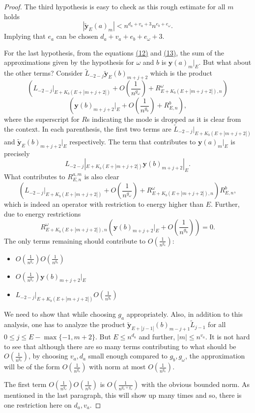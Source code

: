 \documentclass[twoside,11pt,titlepage]{amsart}
\renewcommand{\=}[1]{\stackrel{#1}{=}} %
\theoremstyle{definition}
\theoremstyle{remark}
\begin{document}
\begin{proof}
The third hypothesis is easy to check as this rough estimate for all $m$ holds
$$|\widetilde{\textbf{y}}_E(a)_m| < n^{d_a+v_a+3}n^{e_b+e_\omega}.$$ 
Implying that $e_a$ can be chosen $d_a+v_a+e_b+e_\omega+3$.

For the last hypothesis, from the equations \hyperref[eq12]{(12)} and \hyperref[eq13]{(13)}, the sum of the approximations given by the hypothesis for $\omega$ and $b$ is ${\textbf{y}}(a)_m|_E$. But what about the other terms? Consider $\widetilde{L}_{-2-j}\widetilde{\textbf{y}}_{E}(b)_{m+j+2}$ which is the product
$$(L_{-2-j}|_{E+K_b(E+|m+j+2|)}+O(\frac{1}{n^{g_\omega}})+R_{E+K_b(E+|m+j+2|),n}^\omega)$$
$$({\textbf{y}}(b)_{m+j+2}|_{E}+O(\frac{1}{n^{g_b}})+R_{E,n}^b),$$
where the superscript for $R$s indicating the mode is dropped as it is clear from the context. In each parenthesis, the first two terms are $\widetilde{L}_{-2-j}|_{E+K_b(E+|m+j+2|)}$ and $\widetilde{\textbf{y}}_{E}(b)_{m+j+2}|_{E}$ respectively. The term that contributes to ${\textbf{y}}(a)_m|_E$ is precisely
$$L_{-2-j}|_{E+K_b(E+|m+j+2|)}{\textbf{y}}(b)_{m+j+2}|_{E}.$$
What contributes to $R_{E,n}^{a,m}$ is also clear
$$(L_{-2-j}|_{E+K_b(E+|m+j+2|)}+O(\frac{1}{n^{g_\omega}})+R_{E+K_b(E+|m+j+2|),n}^\omega)R_{E,n}^b,$$
which is indeed an operator with restriction to energy higher than $E$. 
Further, due to energy restrictions
$$R_{E+K_b(E+|m+j+2|),n}^\omega ({\textbf{y}}(b)_{m+j+2}|_{E}+O(\frac{1}{n^{g_b}}))=0.$$
The only terms remaining should contribute to $O(\frac{1}{n^{g_a}})$:
\begin{itemize}
    \item $O(\frac{1}{n^{g_\omega}})O(\frac{1}{n^{g_b}})$
    \item $O(\frac{1}{n^{g_\omega}}){\textbf{y}}(b)_{m+j+2}|_{E}$
    \item $L_{-2-j}|_{E+K_b(E+|m+j+2|)}O(\frac{1}{n^{g_b}})$
\end{itemize}
We need to show that while choosing $g_a$ appropriately. Also, in addition to this analysis, one has to analyze the product $\widetilde{\textbf{y}}_{E+|j-1|}(b)_{m-j+1}\widetilde{L}_{j-1}$ for all $0 \le j \le E-\max\{-1,m+2\}$.  But $E \le n^{d_a}$ and further, $|m| \le n^{v_a}$. It is not hard to see that although there are so many terms contributing to what should be $O(\frac{1}{n^{g_a}})$, by choosing $v_a,d_a$ small enough compared to $g_b,g_\omega$, the approximation will be of the form $O(\frac{1}{n^{g_a}})$ with norm at most $O(\frac{1}{n^{g_a}})$.

The first term $O(\frac{1}{n^{g_\omega}})O(\frac{1}{n^{g_b}})$ is $O(\frac{1}{n^{g_a+g_\omega}})$ with the obvious bounded norm. As mentioned in the last paragraph, this will show up many times and so, there is one restriction here on $d_a,v_a$.


\end{proof}
\end{document}
